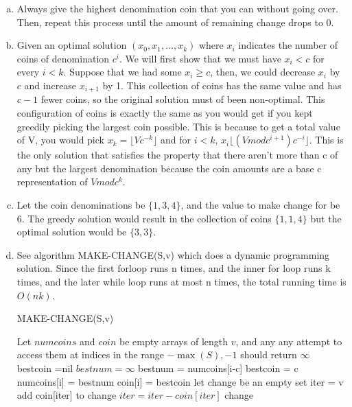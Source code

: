 \documentclass{article}
\begin{document}
\begin{enumerate}[a.]
\item
Always give the highest denomination coin that you can without going over. Then, repeat this process until the amount of remaining change drops to 0.
\item
Given an optimal solution $(x_0,x_1,\ldots,x_k)$ where $x_i$ indicates the number of coins of denomination $c^i$. We will first show that we must have $x_i<c$ for every $i<k$. Suppose that we had some $x_i\ge c$, then, we could decrease $x_i$ by $c$ and increase $x_{i+1}$ by 1. This collection of coins has the same value and has $c-1$ fewer coins, so the original solution must of been non-optimal. This configuration of coins is exactly the same as you would get if you kept greedily picking the largest coin possible. This is because to get a total value of V, you would pick $x_k = \lfloor Vc^{-k}\rfloor$ and for $i<k$, $x_i\lfloor(V mod c^{i+1})c^{-i}\rfloor$. This is the only solution that satisfies the property that there aren't more than c of any but the largest denomination because the coin amounts are a base c representation of $V mod c^k$.
\item
Let the coin denominations be $\{1,3,4\}$, and the value to make change for be 6. The greedy solution would result in the collection of coins $\{1,1,4\}$ but the optimal solution would be $\{3,3\}$.
\item
See algorithm MAKE-CHANGE(S,v) which does a dynamic programming solution. Since the first forloop runs n times, and the inner for loop runs k times, and the later while loop runs at most n times, the total running time is $O(nk)$.
\begin{algorithm}
\caption{MAKE-CHANGE(S,v)} 
\begin{algorithmic}
\State Let $numcoins$ and $coin$ be empty arrays of length $v$, and any any attempt to access them at indices in the range $-\max(S),-1$ should return $\infty$
\State bestcoin =nil
\State $bestnum = \infty$
\State bestnum = numcoins[i-c]
\State bestcoin = c
\EndIf
\EndFor
\State numcoins[i] = bestnum
\State coin[i] = bestcoin
\EndFor
\State let change be an empty set
\State iter = v
\State add coin[iter] to change
\State $iter= iter - coin[iter]$
\EndWhile
\State\Return change
\end{algorithmic}
\end{algorithm}
\end{enumerate}
\end{document}
